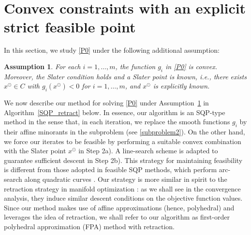 \documentclass[10pt]{article}
\numberwithin{equation}{section}
\newtheorem{assumption}{Assumption}[section]
\def\xfeas{x^\odot}
\begin{document}
\section{Convex constraints with an explicit strict feasible point}\label{sec3}
In this section, we study \eqref{P0} under the following additional assumption:
\begin{assumption}\label{assumption1}
For each $i = 1, \ldots, m$, the function $g_i$ in \eqref{P0} is convex. Moreover, {\color{black} the Slater condition holds and a Slater point is known, i.e., there exists $\xfeas\in C$ with $g_i(\xfeas) < 0$ for $i = 1, \ldots, m$, and $\xfeas$ is explicitly known. }
\end{assumption}
We now describe our method for solving \eqref{P0} under Assumption~\ref{assumption1} in Algorithm~\ref{SQP_retract} below. In essence, our algorithm is an SQP-type method in the sense that, in each iteration, we replace the smooth functions $g_i$ by their affine minorants in the subproblem (see \eqref{subproblem2}). On the other hand, we force our iterates to be feasible by performing a suitable convex combination with the Slater point $\xfeas$ in Step 2a). A line-search scheme is adapted to guarantee sufficient descent in Step 2b). This strategy for maintaining feasibility is different from those adopted in feasible SQP methods, which perform arc-search along quadratic curves \cite{PaTi93,FlPa08}. Our strategy is more similar in spirit to the retraction strategy in manifold optimization \cite{ChenMA20,ChenZM19}: as we shall see in the convergence analysis, they induce similar descent conditions on the objective function values. Since our method makes use of affine approximations (hence, polyhedral) and leverages the idea of retraction, we shall refer to our algorithm as first-order polyhedral approximation (FPA) method with retraction.
\end{document}
